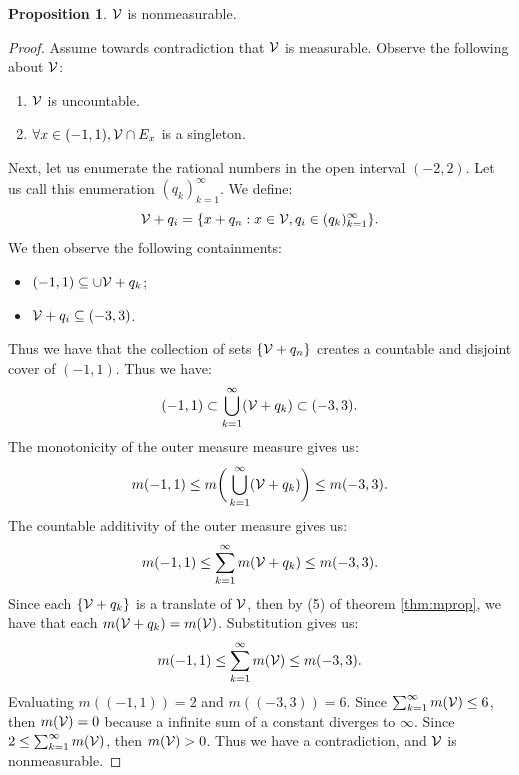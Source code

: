 \documentclass{article}
\theoremstyle{axiom} \newtheorem{axiom}{Axiom}
\theoremstyle{definition} \newtheorem{definition}{Definition}
\theoremstyle{example} \newtheorem{example}{Example}
\theoremstyle{proposition} \newtheorem{prop}{Proposition}
\theoremstyle{lemma} \newtheorem{lemma}{Lemma}
\begin{document}
\begin{prop}
	$\mathcal{V}$ is nonmeasurable.
\end{prop}
\begin{proof}
	Assume towards contradiction that $\mathcal{V}$ is measurable. Observe the following about $\mathcal{V}$:
	\begin{enumerate}
		\item $\mathcal{V}$ is uncountable.
		\item $\forall x \in (-1,1), \mathcal{V} \cap E_x$ is a singleton.
	\end{enumerate}

	Next, let us enumerate the rational numbers in the open interval $(-2,2)$. Let
	us call this enumeration $(q_k)_{k=1}^{\infty}$. We define:
	\begin{equation*}
		\mathcal{V} + q_i = \{ x + q_n : x \in \mathcal{V}, q_i \in (q_k)_{k=1}^{\infty} \}.
	\end{equation*}
	We then observe the following containments:
	\begin{itemize}
		\item $(-1,1) \subseteq \cup \mathcal{V} + q_k$;
		\item $\mathcal{V} + q_i \subseteq (-3,3)$.
	\end{itemize}

	Thus we have that the collection of sets $\{\mathcal{V} + q_n\}$ creates a countable
	and disjoint cover of $(-1,1)$. Thus we have:
	\begin{equation*}
		(-1,1) \subset \bigcup^{\infty}_{k=1} (\mathcal{V}+q_k) \subset (-3,3).
	\end{equation*}
	The monotonicity of the outer measure measure gives us:
	\begin{equation*}
		m(-1,1) \leq m\bigg(\bigcup^{\infty}_{k=1} (\mathcal{V}+q_k) \bigg) \leq m(-3,3).
	\end{equation*}
	The countable additivity of the outer measure gives us:
	\begin{equation*}
		m(-1,1) \leq \sum_{k=1}^{\infty} m(\mathcal{V}+q_k) \leq m(-3,3).
	\end{equation*}
	Since each $\{\mathcal{V}+q_k\}$ is a translate of $\mathcal{V}$, then by (5) of theorem \ref{thm:mprop}, 
	we have that each $m(\mathcal{V}+q_k) = m(\mathcal{V})$. Substitution gives us:
	\begin{equation*}
		m(-1,1) \leq \sum_{k=1}^{\infty} m(\mathcal{V}) \leq m(-3,3).
	\end{equation*}
	Evaluating $m((-1,1)) = 2$ and $m((-3,3)) = 6$. Since $\sum_{k=1}^{\infty} m(\mathcal{V})
	\leq 6$, then $m(\mathcal{V}) = 0$ because a infinite sum of a constant diverges to
	$\infty$. Since $2 \leq \sum_{k=1}^{\infty} m(\mathcal{V})$, then $m(\mathcal{V}) > 0$. Thus
	we have a contradiction, and $\mathcal{V}$ is nonmeasurable. 
\end{proof}
\end{document}
